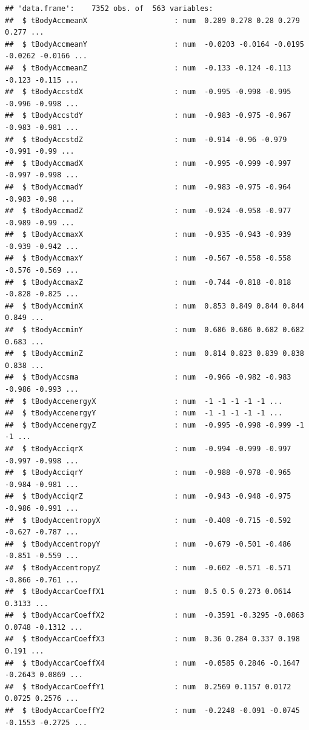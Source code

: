 \documentclass[
]{article}
\begin{document}
\begin{verbatim}
## 'data.frame':    7352 obs. of  563 variables:
##  $ tBodyAccmeanX                    : num  0.289 0.278 0.28 0.279 0.277 ...
##  $ tBodyAccmeanY                    : num  -0.0203 -0.0164 -0.0195 -0.0262 -0.0166 ...
##  $ tBodyAccmeanZ                    : num  -0.133 -0.124 -0.113 -0.123 -0.115 ...
##  $ tBodyAccstdX                     : num  -0.995 -0.998 -0.995 -0.996 -0.998 ...
##  $ tBodyAccstdY                     : num  -0.983 -0.975 -0.967 -0.983 -0.981 ...
##  $ tBodyAccstdZ                     : num  -0.914 -0.96 -0.979 -0.991 -0.99 ...
##  $ tBodyAccmadX                     : num  -0.995 -0.999 -0.997 -0.997 -0.998 ...
##  $ tBodyAccmadY                     : num  -0.983 -0.975 -0.964 -0.983 -0.98 ...
##  $ tBodyAccmadZ                     : num  -0.924 -0.958 -0.977 -0.989 -0.99 ...
##  $ tBodyAccmaxX                     : num  -0.935 -0.943 -0.939 -0.939 -0.942 ...
##  $ tBodyAccmaxY                     : num  -0.567 -0.558 -0.558 -0.576 -0.569 ...
##  $ tBodyAccmaxZ                     : num  -0.744 -0.818 -0.818 -0.828 -0.825 ...
##  $ tBodyAccminX                     : num  0.853 0.849 0.844 0.844 0.849 ...
##  $ tBodyAccminY                     : num  0.686 0.686 0.682 0.682 0.683 ...
##  $ tBodyAccminZ                     : num  0.814 0.823 0.839 0.838 0.838 ...
##  $ tBodyAccsma                      : num  -0.966 -0.982 -0.983 -0.986 -0.993 ...
##  $ tBodyAccenergyX                  : num  -1 -1 -1 -1 -1 ...
##  $ tBodyAccenergyY                  : num  -1 -1 -1 -1 -1 ...
##  $ tBodyAccenergyZ                  : num  -0.995 -0.998 -0.999 -1 -1 ...
##  $ tBodyAcciqrX                     : num  -0.994 -0.999 -0.997 -0.997 -0.998 ...
##  $ tBodyAcciqrY                     : num  -0.988 -0.978 -0.965 -0.984 -0.981 ...
##  $ tBodyAcciqrZ                     : num  -0.943 -0.948 -0.975 -0.986 -0.991 ...
##  $ tBodyAccentropyX                 : num  -0.408 -0.715 -0.592 -0.627 -0.787 ...
##  $ tBodyAccentropyY                 : num  -0.679 -0.501 -0.486 -0.851 -0.559 ...
##  $ tBodyAccentropyZ                 : num  -0.602 -0.571 -0.571 -0.866 -0.761 ...
##  $ tBodyAccarCoeffX1                : num  0.5 0.5 0.273 0.0614 0.3133 ...
##  $ tBodyAccarCoeffX2                : num  -0.3591 -0.3295 -0.0863 0.0748 -0.1312 ...
##  $ tBodyAccarCoeffX3                : num  0.36 0.284 0.337 0.198 0.191 ...
##  $ tBodyAccarCoeffX4                : num  -0.0585 0.2846 -0.1647 -0.2643 0.0869 ...
##  $ tBodyAccarCoeffY1                : num  0.2569 0.1157 0.0172 0.0725 0.2576 ...
##  $ tBodyAccarCoeffY2                : num  -0.2248 -0.091 -0.0745 -0.1553 -0.2725 ...

\end{verbatim}
\end{document}
